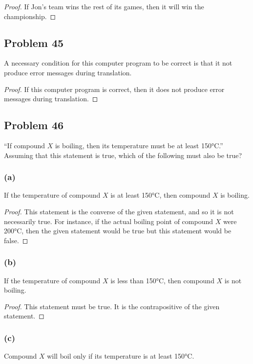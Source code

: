 \documentclass[14pt]{extarticle}
\begin{document}
\begin{proof}
If Jon’s team wins the rest of its games, then it will win the championship.
\end{proof}

\subsection{Problem 45}
A necessary condition for this computer program to be correct is that it not
produce error messages during translation.

\begin{proof}
If this computer program is correct, then it does not produce error messages
during translation.
\end{proof}

\subsection{Problem 46}
“If compound $X$ is boiling, then its temperature must be at least 150°C.”
Assuming that this statement is true, which of the following must also be true?

\subsubsection{(a)}
If the temperature of compound $X$ is at least 150°C, then compound $X$ is
boiling.

\begin{proof}
This statement is the converse of the given statement, and so it is not
necessarily true. For instance, if the actual boiling point of compound $X$ were
200°C, then the given statement would be true but this statement would be false.
\end{proof}

\subsubsection{(b)}
If the temperature of compound $X$ is less than 150°C, then compound $X$ is not
boiling.

\begin{proof}
This statement must be true. It is the contrapositive of the given statement.
\end{proof}

\subsubsection{(c)}
Compound $X$ will boil only if its temperature is at least 150°C.
\end{document}
